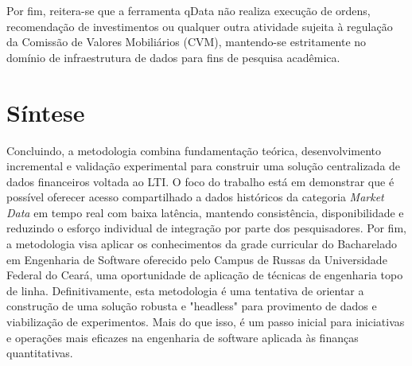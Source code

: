 Por fim, reitera-se que a ferramenta qData não realiza execução de ordens, recomendação de investimentos ou qualquer outra atividade sujeita à regulação da Comissão de Valores Mobiliários (CVM), mantendo-se estritamente no domínio de infraestrutura de dados para fins de pesquisa acadêmica.


\section{Síntese}

Concluindo, a metodologia combina fundamentação teórica, desenvolvimento incremental e validação experimental para construir uma solução centralizada de dados financeiros voltada ao LTI. O foco do trabalho está em demonstrar que é possível oferecer acesso compartilhado a dados históricos da categoria \textit{Market Data} em tempo real com baixa latência, mantendo consistência, disponibilidade e reduzindo o esforço individual de integração por parte dos pesquisadores. Por fim, a metodologia visa aplicar os conhecimentos da grade curricular do Bacharelado em Engenharia de Software oferecido pelo Campus de Russas da Universidade Federal do Ceará, uma oportunidade de aplicação de técnicas de engenharia topo de linha. Definitivamente, esta metodologia é uma tentativa de orientar a construção de uma solução robusta e "headless" para provimento de dados e viabilização de experimentos. Mais do que isso, é um passo inicial para iniciativas e operações mais eficazes na engenharia de software aplicada às finanças quantitativas.
